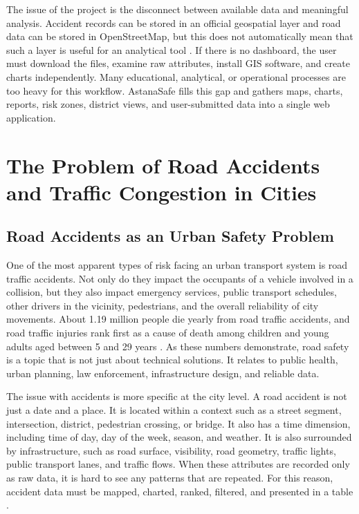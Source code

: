 ﻿\documentclass[12pt,a4paper]{report}
\begin{document}
The issue of the project is the disconnect between available data and meaningful analysis. Accident records can be stored in an official geospatial layer and road data can be stored in OpenStreetMap, but this does not automatically mean that such a layer is useful for an analytical tool \cite{goodchild2007}. If there is no dashboard, the user must download the files, examine raw attributes, install GIS software, and create charts independently. Many educational, analytical, or operational processes are too heavy for this workflow. AstanaSafe fills this gap and gathers maps, charts, reports, risk zones, district views, and user-submitted data into a single web application.

\section{The Problem of Road Accidents and Traffic Congestion in Cities}

\subsection{Road Accidents as an Urban Safety Problem}

One of the most apparent types of risk facing an urban transport system is road traffic accidents. Not only do they impact the occupants of a vehicle involved in a collision, but they also impact emergency services, public transport schedules, other drivers in the vicinity, pedestrians, and the overall reliability of city movements. About 1.19 million people die yearly from road traffic accidents, and road traffic injuries rank first as a cause of death among children and young adults aged between 5 and 29 years \cite{who2023}. As these numbers demonstrate, road safety is a topic that is not just about technical solutions. It relates to public health, urban planning, law enforcement, infrastructure design, and reliable data.

The issue with accidents is more specific at the city level. A road accident is not just a date and a place. It is located within a context such as a street segment, intersection, district, pedestrian crossing, or bridge. It also has a time dimension, including time of day, day of the week, season, and weather. It is also surrounded by infrastructure, such as road surface, visibility, road geometry, traffic lights, public transport lanes, and traffic flows. When these attributes are recorded only as raw data, it is hard to see any patterns that are repeated. For this reason, accident data must be mapped, charted, ranked, filtered, and presented in a table \cite{erdogan2008}.
\end{document}
